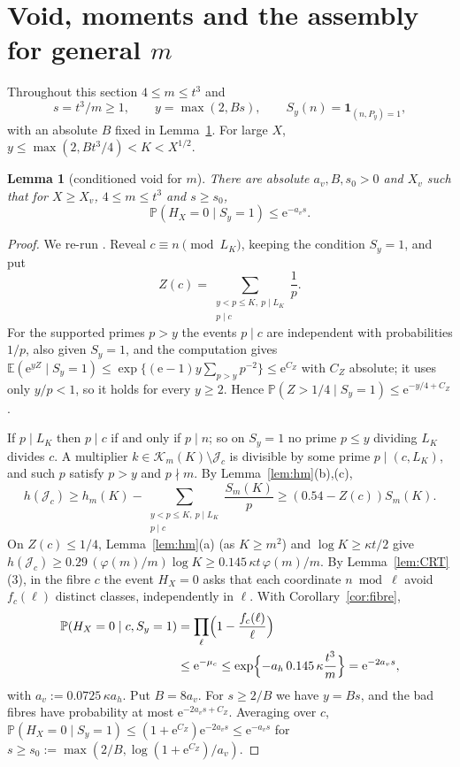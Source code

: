\documentclass[10pt,reqno]{amsart}
\newtheorem{lemma}[theorem]{Lemma}
\theoremstyle{definition}
\newcommand{\K}{\mathcal K}
\newcommand{\J}{\mathcal J}
\newcommand{\E}{\mathbb E}
\newcommand{\Prob}{\mathbb P}
\newcommand{\ind}{\mathbf 1}
\newcommand{\e}{\mathrm e}
\begin{document}
\section{\texorpdfstring{Void, moments and the assembly for general $m$}{Void, moments and the assembly for general m}}\label{sec:assembly}
Throughout this section $4\leq m\leq t^3$ and
\[
 s=t^3/m\geq1,\qquad y=\max(2,Bs),\qquad S_y(n)=\ind_{(n,P_y)=1},
\]
with an absolute $B$ fixed in Lemma~\ref{lem:void}.  For large $X$,
$y\leq\max(2,Bt^3/4)<K<X^{1/2}$.

\begin{lemma}[conditioned void for $m$]\label{lem:void}
There are absolute $a_v,B,s_0>0$ and $X_v$ such that for $X\geq X_v$,
$4\leq m\leq t^3$ and $s\geq s_0$,
\[
 \Prob(H_X=0\mid S_y=1)\leq\e^{-a_vs}.
\]
\end{lemma}

\begin{proof}
We re-run \cite[Lemma~7.1]{TQ}.  Reveal $c\equiv n\pmod{L_K}$, keeping
the condition $S_y=1$, and put
\[
 Z(c)=\sum_{\substack{y<p\leq K,\ p\mid L_K\\p\mid c}}\frac1p.
\]
For the supported primes $p>y$ the events $p\mid c$ are independent
with probabilities $1/p$, also given $S_y=1$, and the computation
\cite[(39)--(40)]{TQ} gives
$\E(\e^{yZ}\mid S_y=1)\leq\exp\{(\e-1)y\sum_{p>y}p^{-2}\}\leq\e^{C_Z}$
with $C_Z$ absolute; it uses only $y/p<1$, so it holds for every
$y\geq2$.  Hence $\Prob(Z>1/4\mid S_y=1)\leq\e^{-y/4+C_Z}$.

If $p\mid L_K$ then $p\mid c$ if and only if $p\mid n$; so on $S_y=1$
no prime $p\leq y$ dividing $L_K$ divides $c$.  A multiplier
$k\in\K_m(K)\setminus\J_c$ is divisible by some prime $p\mid(c,L_K)$,
and such $p$ satisfy $p>y$ and $p\nmid m$.  By Lemma~\ref{lem:hm}(b),(c),
\[
 h(\J_c)\geq h_m(K)-\sum_{\substack{y<p\leq K,\ p\mid L_K\\p\mid c}}\frac{S_m(K)}p
 \geq(0.54-Z(c))S_m(K).
\]
On $Z(c)\leq1/4$, Lemma~\ref{lem:hm}(a) (as $K\geq m^2$) and
$\log K\geq\kappa t/2$ give
$h(\J_c)\geq0.29\,(\varphi(m)/m)\log K\geq0.145\,\kappa t\,\varphi(m)/m$.
By Lemma~\ref{lem:CRT}(3), in the fibre $c$ the event $H_X=0$ asks that
each coordinate $n\bmod\ell$ avoid $f_c(\ell)$ distinct classes,
independently in $\ell$.  With Corollary~\ref{cor:fibre},
\[
 \begin{aligned}
 \Prob(H_X=0\mid c,S_y=1)&=\prod_\ell\Bigl(1-\frac{f_c(\ell)}\ell\Bigr)\\
 &\leq\e^{-\mu_c}\leq\exp\Bigl\{-a_h\,0.145\,\kappa\frac{t^3}m\Bigr\}
 =\e^{-2a_vs},
 \end{aligned}
\]
with $a_v:=0.0725\,\kappa a_h$.  Put $B=8a_v$.  For $s\geq2/B$ we have
$y=Bs$, and the bad fibres have probability at most
$\e^{-2a_vs+C_Z}$.  Averaging over $c$,
$\Prob(H_X=0\mid S_y=1)\leq(1+\e^{C_Z})\e^{-2a_vs}\leq\e^{-a_vs}$ for
$s\geq s_0:=\max(2/B,\log(1+\e^{C_Z})/a_v)$.
\end{proof}
\end{document}
